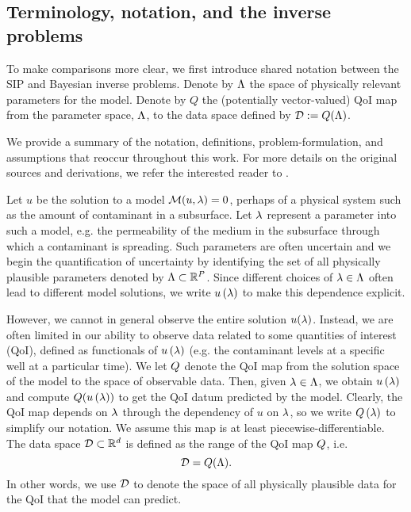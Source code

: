 \subsection{Terminology, notation, and the inverse problems}

To make comparisons more clear, we first introduce shared notation between the SIP and Bayesian inverse problems.
Denote by ${\Lambda}$ the space of physically relevant parameters for the model.
Denote by $Q$ the (potentially vector-valued) QoI map from the parameter space, ${\Lambda}$, to the data space defined by $\mathcal{D}:= Q({\Lambda})$.

We provide a summary of the notation, definitions, problem-formulation, and assumptions that reoccur throughout this work.
For more details on the original sources and derivations,  we refer the interested reader to \cite{BES12, BE13, BET+14}.

Let $u$ be the solution to a model $\mathcal{M}(u, \lambda) = 0$, perhaps of a physical system such as the amount of contaminant in a subsurface.
Let $\lambda$ represent a parameter into such a model, e.g. the permeability of the medium in the subsurface through which a contaminant is spreading.
Such parameters are often uncertain and we begin the quantification of uncertainty by identifying the set of all physically plausible parameters denoted by ${\Lambda}\subset\mathbb{R}^P$.
Since different choices of $\lambda \in {\Lambda}$ often lead to different model solutions, we write $u\left ( \lambda \right )$ to make this dependence explicit.

However, we cannot in general observe the entire solution $u(\lambda)$.
Instead, we are often limited in our ability to observe data related to some quantities of interest (QoI), defined as functionals of $u\left ( \lambda \right )$ (e.g. the contaminant levels at a specific well at a particular time).
We let $Q$ denote the QoI map from the solution space of the model to the space of observable data.
Then, given $\lambda \in {\Lambda}$, we obtain $u\left ( \lambda \right )$ and compute $Q(u\left ( \lambda \right ))$ to get the QoI datum predicted by the model.
Clearly, the QoI map depends on $\lambda$ through the dependency of $u$ on $\lambda$, so we write $Q\left ( \lambda \right )$ to simplify our notation.
We assume this map is at least piecewise-differentiable.
The data space $\mathcal{D} \subset \mathbb{R}^d$ is defined as the range of the QoI map $Q$, i.e.
\[
\mathcal{D} = Q({\Lambda}).
\]
In other words, we use $\mathcal{D}$ to denote the space of all physically plausible data for the QoI that the model can predict.


